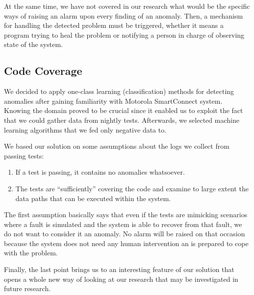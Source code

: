 At the same time, we have not covered in our research what would be the specific ways of raising an alarm upon every finding of an anomaly. Then, a mechanism for handling the detected problem must be triggered, whether it means a program trying to heal the problem or notifying a person in charge of observing state of the system.


\subsection{Code Coverage}
\label{code_coverage}
We decided to apply one-class learning (classification) methods for detecting anomalies after gaining familiarity with Motorola SmartConnect system. 
Knowing the domain proved to be crucial since it enabled us to exploit the fact that we could gather data from nightly tests. 
Afterwards, we selected machine learning algorithms that we fed only negative data to.

We based our solution on some assumptions about the logs we collect from passing tests:
\begin{enumerate}

    \item If a test is passing, it contains no anomalies whatsoever.
    \item The tests are “sufficiently” covering the code and examine to large extent the data paths that can be executed within the system. 

\end{enumerate}

The first assumption basically says that even if the tests are mimicking scenarios where a fault is simulated and the system is able to recover from that fault, we do not want to consider it an anomaly. 
No alarm will be raised on that occasion because the system does not need any human intervention an is prepared to cope with the problem.

Finally, the last point brings us to an interesting feature of our solution that opens a whole new way of looking at our research that may be investigated in future research.

